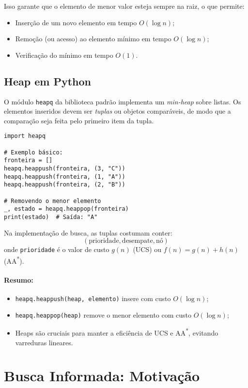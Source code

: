 \documentclass[9pt,a4paper]{extarticle}
\newcommand{\Astar}{A\textsuperscript{*}}
\begin{document}
Isso garante que o elemento de menor valor esteja sempre na raiz, o que permite:
\begin{itemize}
  \item Inserção de um novo elemento em tempo $O(\log n)$;
  \item Remoção (ou acesso) ao elemento mínimo em tempo $O(\log n)$;
  \item Verificação do mínimo em tempo $O(1)$.
\end{itemize}

\subsection*{Heap em Python}

O módulo \texttt{heapq} da biblioteca padrão implementa um \textit{min-heap} sobre listas.
Os elementos inseridos devem ser \emph{tuplas} ou objetos comparáveis,
de modo que a comparação seja feita pelo primeiro item da tupla.

\begin{lstlisting}
import heapq

# Exemplo básico:
fronteira = []
heapq.heappush(fronteira, (3, "C"))
heapq.heappush(fronteira, (1, "A"))
heapq.heappush(fronteira, (2, "B"))

# Removendo o menor elemento
_, estado = heapq.heappop(fronteira)
print(estado)  # Saída: "A"
\end{lstlisting}

Na implementação de busca, as tuplas costumam conter:
\[
(\text{prioridade}, \text{desempate}, \text{nó})
\]
onde \texttt{prioridade} é o valor de custo $g(n)$ (UCS) ou $f(n)=g(n)+h(n)$ (A\Astar).

\paragraph{Resumo:}
\begin{itemize}
  \item \texttt{heapq.heappush(heap, elemento)} insere com custo $O(\log n)$;
  \item \texttt{heapq.heappop(heap)} remove o menor elemento com custo $O(\log n)$;
  \item Heaps são cruciais para manter a eficiência de UCS e A\Astar, evitando varreduras lineares.
\end{itemize}


\section{Busca Informada: Motivação}
\end{document}

